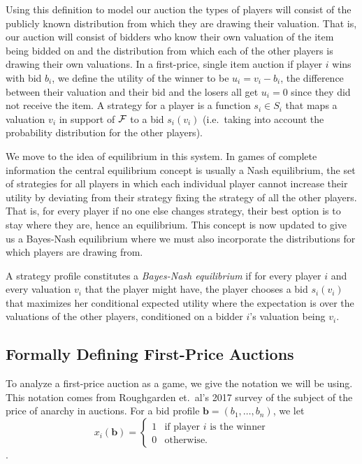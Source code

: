 \documentclass[12pt,twoside]{reedthesis}
\begin{document}
Using this definition to model our auction the types of players will consist of the publicly known distribution from which they are drawing their valuation. That is, our auction will consist of bidders who know their own valuation of the item being bidded on and the distribution from which each of the other players is drawing their own valuations. In a first-price, single item auction if player $i$ wins with bid $b_i$, we define the utility of the winner to be $u_i = v_i - b_i$, the difference between their valuation and their bid and the losers all get $u_i = 0$ since they did not receive the item. A strategy for a player is a function $s_i \in S_i$ that maps a valuation $v_i$ in support of $\mathcal{F}$ to a bid $s_i(v_i)$ (i.e.~taking into account the probability distribution for the other players). %

We move to the idea of equilibrium in this system. In games of complete information the central equilibrium concept is usually a Nash equilibrium, the set of strategies for all players in which each individual player cannot increase their utility by deviating from their strategy fixing the strategy of all the other players. That is, for every player if no one else changes strategy, their best option is to stay where they are, hence an equilibrium. This concept is now updated to give us a Bayes-Nash equilibrium where we must also incorporate the distributions for which players are drawing from. 

\begin{dfn}
	A strategy profile constitutes a {\em Bayes-Nash equilibrium} if for every player $i$ and every valuation $v_i$ that the player might have, the player chooses a bid $s_i(v_i)$ that maximizes her conditional expected utility where the expectation is over the valuations of the other players, conditioned on a bidder $i$'s valuation being $v_i$. 
\end{dfn}

\subsection{Formally Defining First-Price Auctions}
To analyze a first-price auction as a game, we give the notation we will be using. This notation comes from Roughgarden et.~al's 2017 survey of the subject of the price of anarchy in auctions. For a bid profile $\textbf{b} = (b_1, \ldots, b_n)$, we let 
\[
	x_i(\textbf{b}) =
	\begin{cases}
		1 & \text{if player $i$ is the winner} \\
		0 & \text{otherwise}.
	\end{cases}
\].
\end{document}
